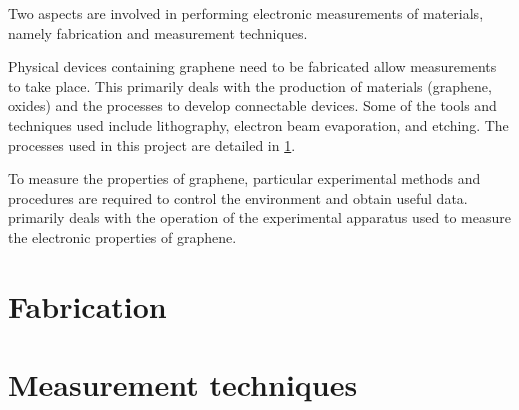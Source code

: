 \documentclass[../Matt_Gebert_Honours_Thesis.tex]{subfiles}
\begin{document}
	

	Two aspects are involved in performing electronic measurements of materials, namely fabrication and measurement techniques. 
	
	Physical devices containing graphene need to be fabricated allow measurements to take place. This primarily deals with the production of materials (graphene, oxides) and the processes to develop connectable devices. Some of the tools and techniques used include lithography, electron beam evaporation, and etching. The processes used in this project are detailed in \cref{sec:fabrication}.
	
	To measure the properties of graphene, particular experimental methods and procedures are required to control the environment and obtain useful data.  primarily deals with the operation of the experimental apparatus used to measure the electronic properties of graphene.

	

	\section{Fabrication}\label{sec:fabrication}
	
		
	\section{Measurement techniques}\label{sec:measurements}
	
	
\end{document}
